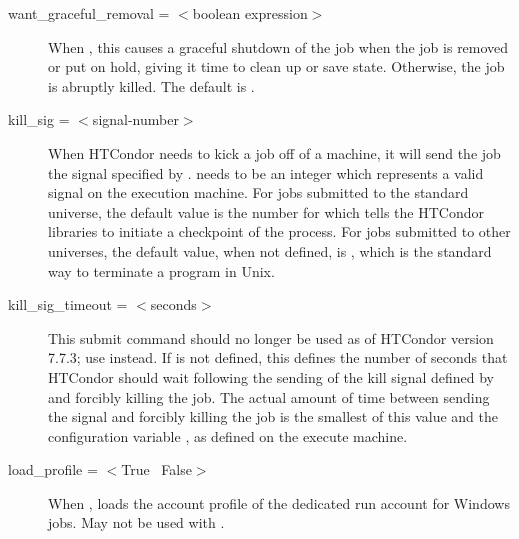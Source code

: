 \begin{description}

\label{condor-submit-want-graceful-removal}
\item[want\_graceful\_removal = $<$boolean expression$>$]
When , this causes a graceful shutdown of the job when the
job is removed or put on hold, giving it time to clean up or save state.
Otherwise, the job is abruptly killed.  The default is .


\label{condor-submit-kill-sig}
\item[kill\_sig = $<$signal-number$>$] When HTCondor needs to kick a job
off of a machine, it will send the job the signal specified by
.
 needs to be an integer which
represents a valid signal on the execution machine.  For jobs submitted
to the standard universe, the default value is the number for
\verb@SIGTSTP@ which tells the HTCondor libraries to initiate a checkpoint
of the process.  For jobs submitted to other universes,
the default value, when not defined,
is \verb@SIGTERM@, which is the standard way to terminate a program in Unix.  


\label{condor-submit-kill-sig-timeout}
\item[kill\_sig\_timeout = $<$seconds$>$] This submit command should
no longer be used as of HTCondor version 7.7.3;
use  instead.
If  is not defined,
this defines the number of seconds that HTCondor
should wait following the sending of the kill signal defined by
 and forcibly killing the job.
The actual amount of time between sending the signal and forcibly killing
the job is the smallest of this value and the configuration variable
, as defined on the execute machine.


\label{condor-submit-load-profile}
\item[load\_profile = $<$True \Bar\ False$>$]
When , loads the account profile of the dedicated run account for
Windows jobs.
May not be used with .


\end{description}
